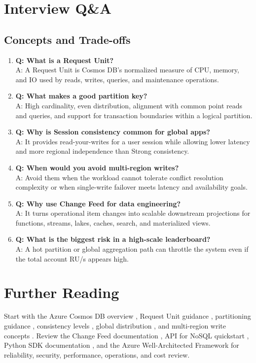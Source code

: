 \section{Interview Q\&A}
\subsection{Concepts and Trade-offs}
\begin{enumerate}
    \item \textbf{Q: What is a Request Unit?}\\
    A: A Request Unit is Cosmos DB's normalized measure of CPU, memory, and IO used by reads, writes, queries, and maintenance operations.
    \item \textbf{Q: What makes a good partition key?}\\
    A: High cardinality, even distribution, alignment with common point reads and queries, and support for transaction boundaries within a logical partition.
    \item \textbf{Q: Why is Session consistency common for global apps?}\\
    A: It provides read-your-writes for a user session while allowing lower latency and more regional independence than Strong consistency.
    \item \textbf{Q: When would you avoid multi-region writes?}\\
    A: Avoid them when the workload cannot tolerate conflict resolution complexity or when single-write failover meets latency and availability goals.
    \item \textbf{Q: Why use Change Feed for data engineering?}\\
    A: It turns operational item changes into scalable downstream projections for functions, streams, lakes, caches, search, and materialized views.
    \item \textbf{Q: What is the biggest risk in a high-scale leaderboard?}\\
    A: A hot partition or global aggregation path can throttle the system even if the total account RU/s appears high.
\end{enumerate}

\section{Further Reading}
Start with the Azure Cosmos DB overview \cite{microsoft2025cosmosOverview}, Request Unit guidance \cite{microsoft2025cosmosRequestUnits}, partitioning guidance \cite{microsoft2025cosmosPartitioning}, consistency levels \cite{microsoft2025cosmosConsistency}, global distribution \cite{microsoft2025cosmosGlobalDistribution}, and multi-region write concepts \cite{microsoft2025cosmosMultiRegionWrites}. Review the Change Feed documentation \cite{microsoft2025cosmosChangeFeed}, API for NoSQL quickstart \cite{microsoft2025cosmosNoSqlQuickstart}, Python SDK documentation \cite{microsoft2025cosmosPythonSdk}, and the Azure Well-Architected Framework \cite{microsoft2025wellarchitected} for reliability, security, performance, operations, and cost review.

